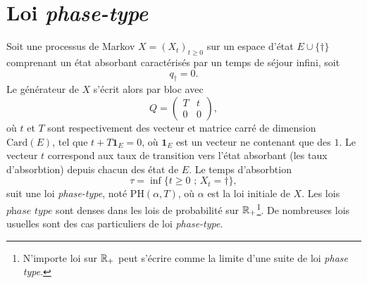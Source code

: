 \section{Loi \textit{phase-type}}\label{sec:phase_type}
Soit une processus de Markov $X=(X_t)_{t\geq 0}$ sur un espace d'état $E\cup\{\dagger\}$ comprenant un état absorbant caractérisés par un temps de séjour infini, soit
$$
q_\dag = 0.
$$
Le générateur de $X$ s'écrit alors par bloc avec 
$$
Q = \left(\begin{array}{c|c}
T&t\\
\hline
0&0
\end{array}\right),
$$
où $t$ et $T$ sont respectivement des vecteur et matrice carré de dimension $\text{Card}(E)$, tel que $t  + T \mathbf{1}_E = 0$, où $\mathbf{1}_E$ est un vecteur ne contenant que des $1$. Le vecteur $t$ correspond aux taux de transition vers l'état absorbant (les taux d'absorbtion) depuis chacun des état de $E$. Le temps d'absorbtion 
$$
\tau = \inf\{t\geq 0\text{ ; }X_t =\dagger\},
$$
suit une loi \textit{phase-type}, noté $\text{PH}(\alpha, T)$, où $\alpha$ est la loi initiale de $X$. Les lois $\textit{phase type}$ sont denses dans les lois de probabilité sur $\mathbb{R}_+$\footnote{N'importe loi  sur $\mathbb{R}_+$ peut s'écrire comme la limite d'une suite de loi \textit{phase type}.}. De nombreuses lois usuelles sont des cas particuliers de loi \textit{phase-type}.
